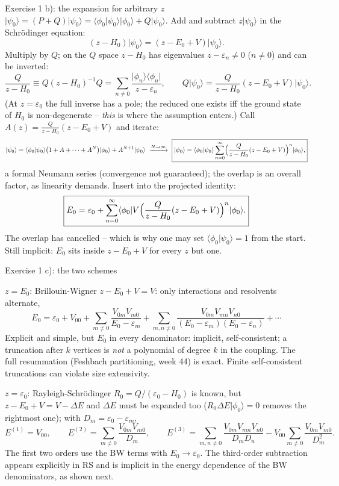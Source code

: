 \documentclass[aspectratio=169,10pt]{beamer}
\newcommand{\ket}[1]{\vert #1\rangle}
\newcommand{\bra}[1]{\langle #1\vert}
\newcommand{\braket}[2]{\langle #1\vert #2\rangle}
\newcommand{\mel}[3]{\langle #1\lvert #2\rvert #3\rangle}
\begin{document}
\begin{frame}[shrink=14]{Exercise 1 b): the expansion for arbitrary \(z\)}
\(\ket{\psi_0}=(P+Q)\ket{\psi_0}=\braket{\phi_0}{\psi_0}\ket{\phi_0}+Q\ket{\psi_0}\). Add and subtract \(z\ket{\psi_0}\) in the Schr\"odinger equation:
\[
(z-H_0)\ket{\psi_0}=(z-E_0+V)\ket{\psi_0}.
\]
Multiply by \(Q\); on the \(Q\) space \(z-H_0\) has eigenvalues \(z-\varepsilon_n\ne0\) (\(n\ne0\)) and can be inverted:
\[
\frac{Q}{z-H_0}\equiv Q(z-H_0)^{-1}Q=\sum_{n\ne0}\frac{\ket{\phi_n}\bra{\phi_n}}{z-\varepsilon_n},
\qquad
Q\ket{\psi_0}=\frac{Q}{z-H_0}(z-E_0+V)\ket{\psi_0}.
\]
(At \(z=\varepsilon_0\) the full inverse has a pole; the reduced one exists iff the ground state of \(H_0\) is non-degenerate -- \emph{this} is where the assumption enters.) Call \(A(z)=\frac{Q}{z-H_0}(z-E_0+V)\) and iterate:
\[
\ket{\psi_0}=\braket{\phi_0}{\psi_0}\bigl(1+A+\cdots+A^N\bigr)\ket{\phi_0}+A^{N+1}\ket{\psi_0}
\ \xrightarrow{N\to\infty}\
\boxed{\ket{\psi_0}=\braket{\phi_0}{\psi_0}\sum_{n=0}^\infty\Bigl(\frac{Q}{z-H_0}(z-E_0+V)\Bigr)^n\ket{\phi_0},}
\]
a formal Neumann series (convergence not guaranteed); the overlap is an overall factor, as linearity demands. Insert into the projected identity:
\[
\boxed{E_0=\varepsilon_0+\sum_{n=0}^\infty\mel{\phi_0}{V\Bigl(\frac{Q}{z-H_0}(z-E_0+V)\Bigr)^n}{\phi_0}.}
\]
The overlap has cancelled -- which is why one may set \(\braket{\phi_0}{\psi_0}=1\) from the start. Still implicit: \(E_0\) sits inside \(z-E_0+V\) for every \(z\) but one.
\end{frame}

\begin{frame}[shrink=8]{Exercise 1 c): the two schemes}
\begin{block}{\(z=E_0\): Brillouin-Wigner}
\(z-E_0+V=V\): only interactions and resolvents alternate,
\[
E_0=\varepsilon_0+V_{00}+\sum_{m\ne0}\frac{V_{0m}V_{m0}}{E_0-\varepsilon_m}+\sum_{m,n\ne0}\frac{V_{0m}V_{mn}V_{n0}}{(E_0-\varepsilon_m)(E_0-\varepsilon_n)}+\cdots
\]
Explicit and simple, but \(E_0\) in every denominator: implicit, self-consistent; a truncation after \(k\) vertices is \emph{not} a polynomial of degree \(k\) in the coupling. The full resummation (Feshbach partitioning, week 44) is exact. Finite self-consistent truncations can violate size extensivity.
\end{block}
\begin{exampleblock}{\(z=\varepsilon_0\): Rayleigh-Schr\"odinger}
\(R_0=Q/(\varepsilon_0-H_0)\) is known, but \(z-E_0+V=V-\Delta E\) and \(\Delta E\) must be expanded too (\(R_0\Delta E\ket{\phi_0}=0\) removes the rightmost one); with \(D_m=\varepsilon_0-\varepsilon_m\),
\[
E^{(1)}=V_{00},\qquad E^{(2)}=\sum_{m\ne0}\frac{V_{0m}V_{m0}}{D_m},\qquad
E^{(3)}=\sum_{m,n\ne0}\frac{V_{0m}V_{mn}V_{n0}}{D_mD_n}-V_{00}\sum_{m\ne0}\frac{V_{0m}V_{m0}}{D_m^2}.
\]
The first two orders use the BW terms with $E_0\to\varepsilon_0$. The third-order subtraction appears explicitly in RS and is implicit in the energy dependence of the BW denominators, as shown next.
\end{exampleblock}
\end{frame}
\end{document}
